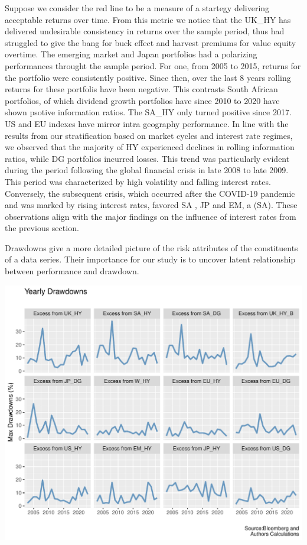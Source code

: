 \documentclass[12pt,preprint, authoryear]{elsarticle}
\let\origfigure\figure
\let\endorigfigure\endfigure
\renewenvironment{figure}[1][2] {
    \expandafter\origfigure\expandafter[H]
} {
    \endorigfigure
}
\numberwithin{equation}{section}
\numberwithin{figure}{section}
\numberwithin{table}{section}
\begin{document}
Suppose we consider the red line to be a measure of a startegy
delivering acceptable returns over time. From this metric we notice that
the UK\_HY has delivered undesirable consistency in returns over the
sample period, thus had struggled to give the bang for buck effect and
harvest premiums for value equity overtime. The emerging market and
Japan portfolios had a polarizing performances throught the sample
period. For one, from 2005 to 2015, returns for the portfolio were
consistently positive. Since then, over the last 8 years rolling returns
for these portfolis have been negative. This contrasts South African
portfolios, of which dividend growth portfolios have since 2010 to 2020
have shown psotive information ratios. The SA\_HY only turned positive
since 2017. US and EU indexes have mirror intra geography performance.
In line with the results from our stratification based on market cycles
and interest rate regimes, we observed that the majority of HY
experienced declines in rolling information ratios, while DG portfolios
incurred losses. This trend was particularly evident during the period
following the global financial crisis in late 2008 to late 2009. This
period was characterized by high volatility and falling interest rates.
Conversely, the subsequent crisis, which occurred after the COVID-19
pandemic and was marked by rising interest rates, favored SA , JP and
EM, a (SA). These observations align with the major findings on the
influence of interest rates from the previous section.

Drawdowns give a more detailed picture of the risk attributes of the
constituents of a data series. Their importance for our study is to
uncover latent relationship between performance and drawdown.

\begin{figure}[H]

\includegraphics{Much_Ado_About_Dividends_files/figure-latex/Figure2-1} \hfill{}

\caption{Rolling 3 Year Returns \label{fig2}}\label{fig:Figure2}
\end{figure}
\end{document}
